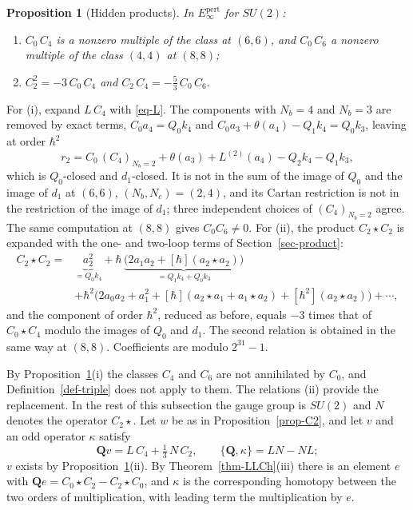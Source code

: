 \documentclass[11pt]{article}
\numberwithin{equation}{section}
\numberwithin{figure}{section}
\numberwithin{table}{section}
\newtheorem{proposition}[theorem]{Proposition}
\theoremstyle{definition}
\newcommand{\Qp}{\mathbf Q}
\newcommand{\Ep}{E_\infty^{\mathrm{pert}}}
\begin{document}
\begin{proposition}[Hidden products]\label{prop-hidden}
In $\Ep$ for $SU(2)$:
\begin{enumerate}
\item[(i)] $C_0\,C_4$ is a nonzero multiple of the class at $(6,6)$, and $C_0\,C_6$ a nonzero multiple of the class $(4,4)$ at $(8,8)$;
\item[(ii)] $C_2^2=-3\,C_0\,C_4$ and $C_2\,C_4=-\tfrac53\,C_0\,C_6$.
\end{enumerate}
\end{proposition}

\begin{proofbox}
For (i), expand $L\,C_4$ with \eqref{eq-L}. The components with $N_b=4$ and $N_b=3$ are removed by exact terms, $C_0a_4=Q_0k_4$ and $C_0a_3+\theta(a_4)-Q_1k_4=Q_0k_3$, leaving at order $\hbar^2$
\[
r_2=C_0\,(C_4)_{N_b=2}+\theta(a_3)+L^{(2)}(a_4)-Q_2k_4-Q_1k_3 ,
\]
which is $Q_0$-closed and $d_1$-closed. It is not in the sum of the image of $Q_0$ and the image of $d_1$ at $(6,6)$, $(N_b,N_c)=(2,4)$, and its Cartan restriction is not in the restriction of the image of $d_1$; three independent choices of $(C_4)_{N_b=2}$ agree. The same computation at $(8,8)$ gives $C_0C_6\neq0$. For (ii), the product $C_2\star C_2$ is expanded with the one- and two-loop terms of Section~\ref{sec-product}:
\begin{align*}
C_2\star C_2={}&\underbrace{a_2^2}_{=Q_0k_4}+\hbar\,\underbrace{\big(2a_1a_2+[\hbar](a_2\star a_2)\big)}_{=Q_1k_4+Q_0k_3}\\
&+\hbar^2\big(2a_0a_2+a_1^2+[\hbar](a_2\star a_1+a_1\star a_2)+[\hbar^2](a_2\star a_2)\big)+\cdots,
\end{align*}
and the component of order $\hbar^2$, reduced as before, equals $-3$ times that of $C_0\star C_4$ modulo the images of $Q_0$ and $d_1$. The second relation is obtained in the same way at $(8,8)$. Coefficients are modulo $2^{31}-1$.
\end{proofbox}

By Proposition~\ref{prop-hidden}(i) the classes $C_4$ and $C_6$ are not annihilated by $C_0$, and Definition~\ref{def-triple} does not apply to them. The relations (ii) provide the replacement. In the rest of this subsection the gauge group is $SU(2)$ and $N$ denotes the operator $C_2\star{}$. Let $w$ be as in Proposition~\ref{prop-C2}, and let $v$ and an odd operator $\kappa$ satisfy
\begin{equation}\label{eq-v-kappa}
\Qp v=L\,C_4+\tfrac13\,N\,C_2,\qquad \{\Qp,\kappa\}=LN-NL ;
\end{equation}
$v$ exists by Proposition~\ref{prop-hidden}(ii). By Theorem~\ref{thm-LLCh}(iii) there is an element $e$ with $\Qp e=C_0\star C_2-C_2\star C_0$, and $\kappa$ is the corresponding homotopy between the two orders of multiplication, with leading term the multiplication by $e$.
\end{document}
